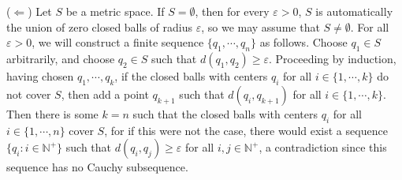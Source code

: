 \documentclass[a4paper,12pt]{article}
\begin{document}
\begin{enumerate}
            ($\Leftarrow$) Let $S$ be a metric space. If $S = \emptyset$, then for every $\varepsilon > 0$, $S$ is automatically the union of zero closed balls of radius $\varepsilon$, so we may assume that $S \neq \emptyset$. For all $\varepsilon > 0$, we will construct a finite sequence $\{ q_1, \cdots, q_n \}$ as follows. Choose $q_1 \in S$ arbitrarily, and choose $q_2 \in S$ such that $d(q_1, q_2) \geq \varepsilon$. Proceeding by induction, having chosen $q_1, \cdots, q_k$, if the closed balls with centers $q_i$ for all $i \in \{ 1, \cdots, k\}$ do not cover $S$, then add a point $q_{k + 1}$ such that $d(q_i, q_{k + 1})$ for all $i \in \{ 1, \cdots, k \}$. Then there is some $k = n$ such that the closed balls with centers $q_i$ for all $i \in \{1, \cdots, n\}$ cover $S$, for if this were not the case, there would exist a sequence $\{ q_i : i \in \mathbb{N}^+ \}$ such that $d(q_i, q_j) \geq \varepsilon$ for all $i, j \in \mathbb{N}^+$, a contradiction since this sequence has no Cauchy subsequence.
    \end{enumerate}
\end{document}
